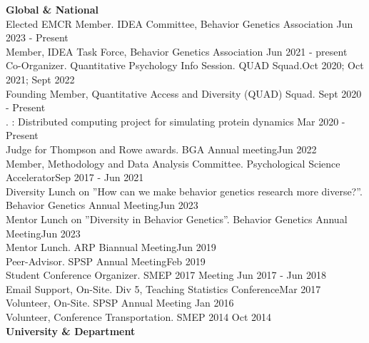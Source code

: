 {\large \textbf{Global \& National}}\smallskip\\
Elected EMCR Member. IDEA Committee, Behavior Genetics Association \hfill{Jun 2023 - Present}\smallskip\\ %
Member, IDEA Task Force, Behavior Genetics Association \hfill{Jun 2021 - present}\smallskip\\
Co-Organizer. Quantitative Psychology Info Session. QUAD Squad.\hfill{Oct 2020; Oct 2021; Sept 2022}\smallskip\\
Founding Member, Quantitative Access and Diversity (QUAD) Squad. \hfill{Sept 2020 - Present}\smallskip\\%
. : Distributed computing project for simulating protein dynamics \hfill{Mar 2020 - Present}\smallskip\\
Judge for Thompson and Rowe awards. BGA Annual meeting\hfill{Jun 2022}\smallskip\\
Member, Methodology and Data Analysis Committee. Psychological Science Accelerator\hfill{Sep 2017 - Jun 2021}\smallskip\\
%
Diversity Lunch on ''How can we make behavior genetics research more diverse?''. Behavior Genetics Annual Meeting\hfill{Jun 2023}\smallskip\\
Mentor Lunch on ''Diversity in Behavior Genetics''. Behavior Genetics Annual Meeting\hfill{Jun 2023}\smallskip\\
Mentor Lunch. ARP Biannual Meeting\hfill{Jun 2019}\smallskip\\
Peer-Advisor. SPSP Annual Meeting\hfill{Feb 2019}\smallskip\\
Student Conference Organizer. SMEP 2017 Meeting \hfill{Jun 2017 - Jun 2018}\smallskip\\
Email Support, On-Site. Div 5, Teaching Statistics Conference\hfill{Mar 2017}\smallskip\\
Volunteer, On-Site. SPSP Annual Meeting \hfill{Jan 2016}\smallskip\\
Volunteer, Conference Transportation. SMEP 2014  \hfill{Oct 2014}\smallskip\\
{\large \textbf{University \& Department}}\smallskip\\

